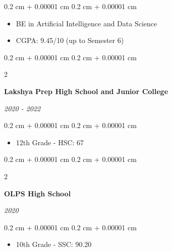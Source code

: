 \documentclass[10pt, letterpaper]{article}
\newenvironment{highlights}{
    \begin{itemize}[
        topsep=0.10 cm,
        parsep=0.10 cm,
        partopsep=0pt,
        itemsep=0pt,
        leftmargin=0.4 cm + 10pt
    ]
}{
    \end{itemize}
} %
\newenvironment{onecolentry}{
    \begin{adjustwidth}{
        0.2 cm + 0.00001 cm
    }{
        0.2 cm + 0.00001 cm
    }
}{
    \end{adjustwidth}
} %
\newenvironment{twocolentry}[2][]{
    \onecolentry
    \def\secondColumn{#2}
    \setcolumnwidth{\fill, 4.5 cm}
    \begin{paracol}{2}
}{
    \switchcolumn \raggedleft \secondColumn
    \end{paracol}
    \endonecolentry
} %
\begin{document}
\vspace{0.10 cm}
\begin{onecolentry}
    \begin{highlights}
        \item BE in Artificial Intelligence and Data Science
        \item CGPA: 9.45/10 (up to Semester 6) 
    \end{highlights}
\end{onecolentry}

\vspace{0.2 cm}

\begin{twocolentry}{
    \textit{2020 - 2022}}
    \textbf{Lakshya Prep High School and Junior College}
\end{twocolentry}

\vspace{0.10 cm}
\begin{onecolentry}
    \begin{highlights}
        \item 12th Grade - HSC: 67%
    \end{highlights}
\end{onecolentry}

\vspace{0.2 cm}

\begin{twocolentry}{
    \textit{2020}}
    \textbf{OLPS High School}
\end{twocolentry}

\vspace{0.10 cm}
\begin{onecolentry}
    \begin{highlights}
        \item 10th Grade - SSC: 90.20%
    \end{highlights}
\end{onecolentry}



        
            
            
\end{document}
